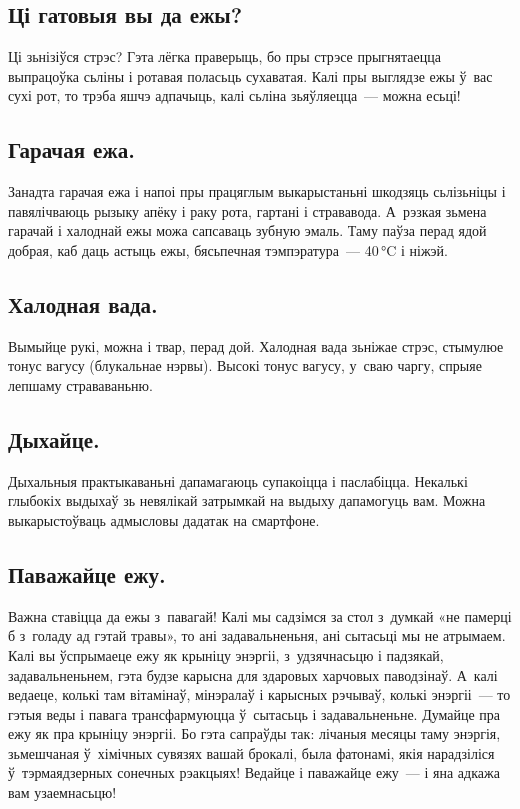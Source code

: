 \subsection{Ці гатовыя вы да ежы?}
Ці зьнізіўся стрэс? Гэта лёгка праверыць, бо пры стрэсе прыгнятаецца выпрацоўка сьліны і ротавая поласьць сухаватая. Калі пры выглядзе ежы ў~вас сухі рот, то трэба яшчэ адпачыць, калі сьліна зьяўляецца~--- можна есьці!

\subsection{Гарачая ежа.}
Занадта гарачая ежа і напоі пры працяглым выкарыстаньні шкодзяць сьлізьніцы і павялічваюць рызыку апёку і раку рота, гартані і стрававода. А~рэзкая зьмена гарачай і халоднай ежы можа сапсаваць зубную эмаль. Таму паўза перад ядой добрая, каб даць астыць ежы, бясьпечная тэмпэратура~--- 40\,°C і ніжэй.

\subsection{Халодная вада.}
Вымыйце рукі, можна і твар, перад дой. Халодная вада зьніжае стрэс, стымулюе тонус вагусу (блукальнае нэрвы). Высокі тонус вагусу, у~сваю чаргу, спрыяе лепшаму страваваньню.

\subsection{Дыхайце.}
Дыхальныя практыкаваньні дапамагаюць супакоіцца і паслабіцца. Некалькі глыбокіх выдыхаў зь невялікай затрымкай на выдыху дапамогуць вам. Можна выкарыстоўваць адмысловы дадатак на смартфоне.

\subsection{Паважайце ежу.}
Важна ставіцца да ежы з~павагай! Калі мы садзімся за стол з~думкай «не памерці б з~голаду ад гэтай травы», то ані задавальненьня, ані сытасьці мы не атрымаем. Калі вы ўспрымаеце ежу як крыніцу энэргіі, з~удзячнасьцю і падзякай, задавальненьнем, гэта будзе карысна для здаровых харчовых паводзінаў. А~калі ведаеце, колькі там вітамінаў, мінэралаў і карысных рэчываў, колькі энэргіі~--- то гэтыя веды і павага трансфармуюцца ў~сытасьць і задавальненьне. Думайце пра ежу як пра крыніцу энэргіі. Бо гэта сапраўды так: лічаныя месяцы таму энэргія, зьмешчаная ў~хімічных сувязях вашай брокалі, была фатонамі, якія нарадзіліся ў~тэрмаядзерных сонечных рэакцыях! Ведайце і паважайце ежу~--- і яна адкажа вам узаемнасьцю!


